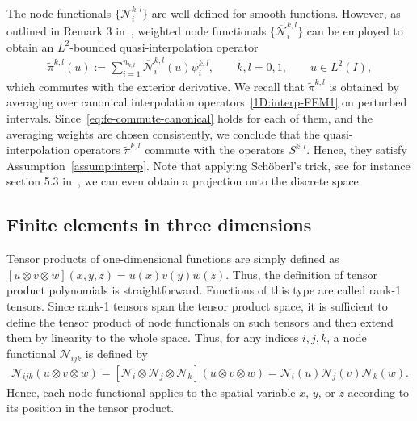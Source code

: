 \documentclass[final]{amsart}%
\newcommand{\0}{\mathaccent23}
\newcommand{\nodal}{\mathcal N}
\newcommand{\winterp}{\pi}
\newcommand{\wnodal}{\overline{\nodal}}
\begin{document}
The node functionals $\{\nodal^{k,l}_i\}$ are well-defined for smooth functions. However, as outlined in Remark 3 in~\cite{Bonizzoni-Kanschat2022}, weighted node functionals $\{\wnodal^{k,l}_i\}$ can be employed to obtain an $L^2$-bounded quasi-interpolation operator
\begin{gather}
  \label{1D:quasi-interp-FEM}
  \widetilde{\winterp}^{k,l}(u):=\sum_{i=1}^{n_{k,l}}
  \wnodal^{k,l}_i(u) \psi^{k,l}_i,
  \qquad k,l=0,1,
  \qquad u\in L^2(I),
\end{gather}
which commutes with the exterior derivative. We recall that $\widetilde{\winterp}^{k,l}$ is obtained by averaging over canonical interpolation operators~\eqref{1D:interp-FEM1} on perturbed intervals. Since~\eqref{eq:fe-commute-canonical} holds for each of them, and the averaging weights are chosen consistently, we conclude that the quasi-interpolation operators $\widetilde{\winterp}^{k,l}$ commute with the operators $S^{k,l}$. Hence, they satisfy Assumption~\ref{assump:interp}.
Note that applying Schöberl's trick, see for instance section 5.3 in~\cite{bonizzoni2021h}, we can even obtain a projection onto the discrete space.

\subsection{Finite elements in three dimensions}\label{sec:finite-elements-3D}
Tensor products of one-di\-men\-sion\-al functions are simply defined as $[u\otimes v\otimes w](x,y,z) = u(x)v(y)w(z)$. Thus, the definition of tensor product polynomials is straightforward.
Functions of this type are called rank-1 tensors. Since rank-1 tensors span the tensor product space, it is sufficient to define the tensor product of node functionals on such tensors and then extend them by linearity to the whole space.
Thus, for any indices $i,j,k$, a node functional $\nodal_{ijk}$ is defined by
\begin{gather}
  \label{eq:nodal-tensor}
    \nodal_{ijk}(u\otimes v\otimes w)
    = [\nodal_i\otimes\nodal_j\otimes\nodal_k](u\otimes v\otimes w)
    = \nodal_i(u)\nodal_j(v)\nodal_k(w).
\end{gather}
Hence, each node functional applies to the spatial variable $x$, $y$, or $z$ according to its position in the tensor product.
\end{document}
